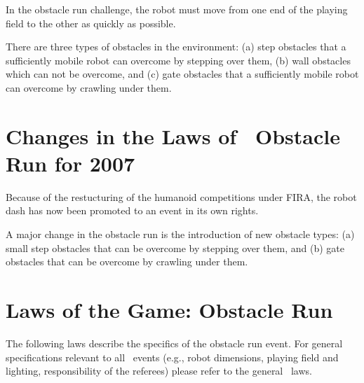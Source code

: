\documentclass[12pt]{hurocup}
\begin{document}
In the obstacle run challenge, the robot must move from one end of the
playing field to the other as quickly as possible.

There are three types of obstacles in the environment: (a) step
obstacles that a sufficiently mobile robot can overcome by stepping
over them, (b) wall obstacles which can not be overcome, and (c) gate
obstacles that a sufficiently mobile robot can overcome by crawling
under them.

\section{Changes in the Laws of \HuroCup\ Obstacle Run for 2007}

Because of the restucturing of the humanoid competitions under FIRA,
the robot dash has now been promoted to an event in its own
rights.

A major change in the obstacle run is the introduction of new obstacle
types: (a) small step obstacles that can be overcome by stepping over
them, and (b) gate obstacles that can be overcome by crawling under
them.

\section{Laws of the Game: Obstacle Run}
\label{sec:laws-obstacle-run}

The following laws describe the specifics of the obstacle run
event. For general specifications relevant to all \HuroCup\ events
(e.g., robot dimensions, playing field and lighting, responsibility of
the referees) please refer to the general \HuroCup\ laws.

\label{law:or-field}
\end{document}
